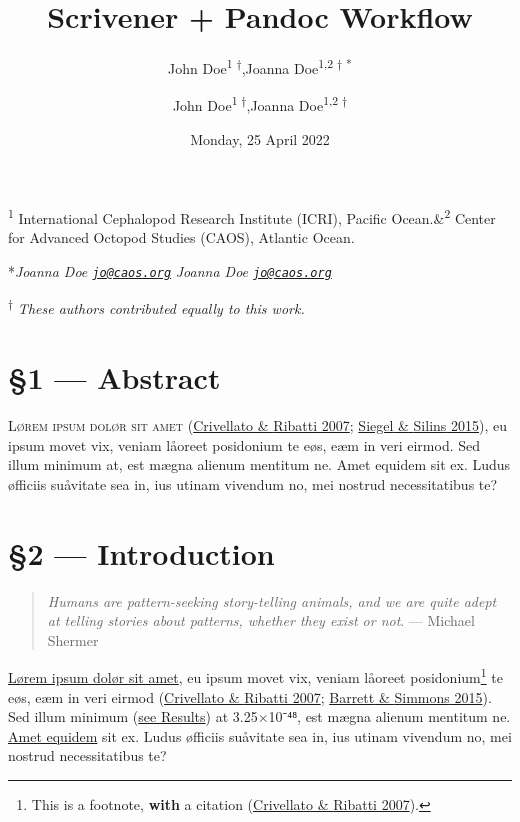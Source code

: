\documentclass[
  12pt,
  a4paper,
]{article}
\title{Scrivener + Pandoc Workflow}
\author{\textsf{John Doe\textsuperscript{1 †},\quad Joanna
Doe\textsuperscript{1,2 † *}}}
\author{\textsf{John Doe\textsuperscript{1 †},\quad Joanna
Doe\textsuperscript{1,2 † \fixfontB{✉︎}}}}
\date{Monday, 25 April 2022}
\begin{document}
\maketitle

\begin{center}

\textsf{\textsuperscript{1} International Cephalopod Research Institute
(ICRI), Pacific Ocean.\quad\&\quad\textsuperscript{2} Center for
Advanced Octopod Studies (CAOS), Atlantic Ocean.}

\ifPDFTeX
\textsf{*\emph{Joanna Doe
\href{mailto:jo@caos.org}{\nolinkurl{jo@caos.org}}}}
\else
\textsf{ \emph{Joanna Doe
\href{mailto:jo@caos.org}{\nolinkurl{jo@caos.org}}}}
\fi

\textsf{\textsuperscript{†} \small{\emph{These authors contributed equally to this work.}}}


\end{center}


{
\hypersetup{linkcolor=}
\setcounter{tocdepth}{4}
\tableofcontents
}
\hypertarget{abstract}{%
\section{§1 --- Abstract}\label{abstract}}

\textsc{Lørem ipsum dolør sit amet}
(\protect\hyperlink{ref-crivellato2007}{{Crivellato} \& {Ribatti} 2007};
\protect\hyperlink{ref-siegel2015}{{Siegel} \& {Silins} 2015}), eu ipsum
movet vix, veniam låoreet posidonium te eøs, eæm in veri eirmod. Sed
illum minimum at, est mægna alienum mentitum ne. Amet equidem sit ex.
Ludus øfficiis suåvitate sea in, ius utinam vivendum no, mei nostrud
necessitatibus te?

\hypertarget{introduction}{%
\section{§2 --- Introduction}\label{introduction}}

\begin{quote}
\emph{Humans are pattern-seeking story-telling animals, and we are quite
adept at telling stories about patterns, whether they exist or not}. ---
Michael Shermer
\end{quote}

\uline{Lørem ipsum dolør sit amet}, eu ipsum movet vix, veniam låoreet
posidonium\footnote{This is a footnote, \textbf{with} a citation
  (\protect\hyperlink{ref-crivellato2007}{{Crivellato} \& {Ribatti}
  2007}).} te eøs, eæm in veri eirmod
(\protect\hyperlink{ref-crivellato2007}{{Crivellato} \& {Ribatti} 2007};
\protect\hyperlink{ref-barrett2015}{{Barrett} \& {Simmons} 2015}). Sed
illum minimum (\protect\hyperlink{lunar-cycles}{see Results}) at
3.25×10⁻⁴⁸, est mægna alienum mentitum ne.
\href{https://pandoc.org/MANUAL.html}{Amet equidem} sit ex. Ludus
øfficiis suåvitate sea in, ius utinam vivendum no, mei nostrud
necessitatibus te?
\end{document}

